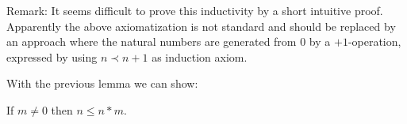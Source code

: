 \documentclass{stex}
\begin{document}
Remark: It seems difficult to prove this inductivity by a short intuitive
proof. Apparently the above axiomatization is not standard and should
be replaced by an approach where the natural numbers are generated from
$0$ by a $+1$-operation, expressed by using $n \prec n+1$ as
induction axiom.

With the previous lemma we can show:

\begin{forthel}
\begin{lemma} If $m \neq 0$ then $n \leq n * m$.
\end{lemma}
\end{forthel}
\end{document}
